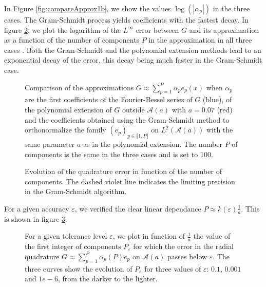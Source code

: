 \documentclass[11pt,a4paper]{article}
\begin{document}
In Figure \ref{fig:compareApprox1b}, we show the values $\log(|\alpha_p|)$ in the three cases. The Gram-Schmidt process yields coefficients with the fastest decay. 
In figure \ref{compareApprox2}, we plot the logarithm of the $L^{\infty}$ error between $G$ and its approximation as a function of the number of components $P$ in the approximation in all three cases . Both the Gram-Schmidt and the polynomial extension methods lead to an exponential decay of the error, this decay being much faster in the Gram-Schmidt case.   
\begin{figure}
\centering
\subfigure[Logarithmic error $e = \log\left(\left|G(x) - \displaystyle\sum_{p=1}^P \alpha_p e_p(x)\right|\right)$]{\label{fig:compareApprox1a}}
\caption{Comparison of the approximations $G \approx \displaystyle\sum_{p=1}^P \alpha_p e_p(x)$ when $\alpha_p$ are the first coefficients of the Fourier-Bessel series of $G$ (blue), of the polynomial extension of $G$  outside $\mathcal{A}(a)$ with $a = 0.07$ (red) and the coefficients obtained using the Gram-Schmidt method to orthonormalize the family $(e_p)_{p\in\llbracket 1,P\rrbracket}$ on $L^2\left(\mathcal{A}(a)\right)$ with the same parameter $a$ as in the polynomial extension. The number $P$ of components is the same in the three cases and is set to $100$. }
\label{compareApprox1}
\end{figure}
\begin{figure}
\centering 

\caption{Evolution of the quadrature error in function of the number of components. The dashed violet line indicates the limiting precision in the Gram-Schmidt algorithm. }
\label{compareApprox2}
\end{figure}

For a given accuracy $\varepsilon$, we verified the clear linear dependance $P \approx k(\varepsilon) \frac{1}{a}$. This is shown in figure \ref{evolutionOfA}. 
\begin{figure}[H]
\centering

\label{evolutionOfA}
\caption{For a given tolerance level $\varepsilon$, we plot in function of $\frac {1}{a}$ the value of the first integer of components $P_{\varepsilon}$ for which the error in the radial quadrature $G \approx \sum_{p=1}^P \alpha_p(P) e_p$ on $\mathcal{A}(a)$ passes below $\varepsilon$. The three curves show the evolution of $P_{\varepsilon}$ for three values of $\varepsilon$: $0.1$, $0.001$ and $1e-6$, from the darker to the lighter.}
\end{figure} 
 
\end{document}
